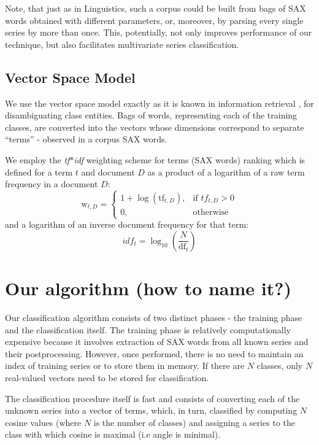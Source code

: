 \documentclass{llncs}
\begin{document}
Note, that just as in Linguistics, such a corpus could be built from bags of SAX words obtained with
different parameters, or, moreover, by parsing every single series by more than once. This,
potentially, not only improves performance of our technique, but also facilitates multivariate
series classification.

\subsection{Vector Space Model}
We use the vector space model exactly as it is known in information retrieval \cite{salton}, for
disambiguating class entities. Bags of words, representing each of the training classes, are
converted into the vectors whose dimensions correspond to separate “terms” - observed in a corpus
SAX words. 

We employ the \textit{tf$\ast$idf} weighting scheme for terms (SAX words) ranking 
which is defined for a term $t$ and document $D$ 
as a product of a logarithm of a raw term frequency in a document $D$:
\begin{equation}
 \mbox{w}_{t, D} =  \begin{cases} 1 + \log(\mbox{tf}_{t,D}), & \mbox{if } tf_{t,D}>0  \\ 0, & \mbox{otherwise } \end{cases}
\end{equation} 
and a logarithm of an inverse document frequency for that term:
\begin{equation}
 idf_{t} =  \log_{10}(\frac{N}{\mbox{df}_{t}})
\end{equation} 

\section{Our algorithm (how to name it?)}
Our classification algorithm consists of two distinct phases - the training phase and the
classification itself. The training phase is relatively computationally expensive because it
involves extraction of SAX words from all known series and their postprocessing. However, once
performed, there is no need to maintain an index of training series or to store them in memory. If
there are $N$ classes, only $N$ real-valued vectors need to be stored for classification.

The classification procedure itself is fast and consists of converting each of the unknown series
into a vector of terms, which, in turn, classified by computing $N$ cosine values (where $N$ is the
number of classes) and assigning a series to the class with which cosine is maximal (i.e angle is
minimal).
\end{document}
